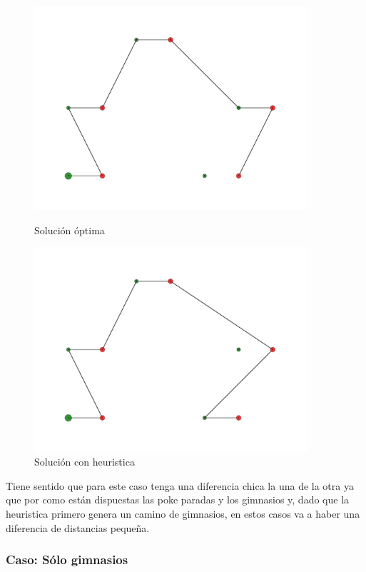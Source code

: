 \begin{figure}[H]
\centering
\begin{minipage}{0.45\textwidth}
\centering
\includegraphics[width=0.9\textwidth]{imagenes/test2-soltest2BT.pdf}
\caption{Solución óptima}
\label{fig:ej2_caso2bt}
\end{minipage}
\qquad
\begin{minipage}{0.45\textwidth}
\centering
\includegraphics[width=0.9\textwidth]{imagenes/test2-soltest2H.pdf}
\caption{Solución con heuristica}
\label{fig:ej2_caso2h}
\end{minipage}
\end{figure}


Tiene sentido que para este caso tenga una diferencia chica la una de la otra ya que por como están dispuestas las poke paradas y los gimnasios y, dado que la heuristica primero genera un camino de gimnasios, en estos casos va a haber una diferencia de distancias pequeña.


\subsubsection{Caso: Sólo gimnasios}
